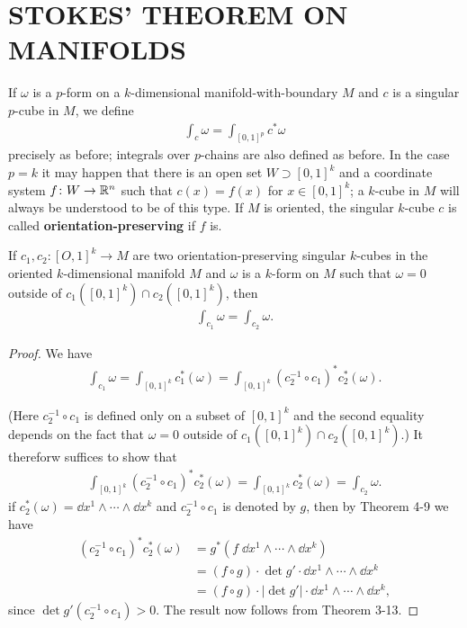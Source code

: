 \clearpage
\section[\textsc{stokes' theorem on manifolds}]{STOKES' THEOREM ON MANIFOLDS}
If $\omega$ is a $p$-form on a $k$-dimensional manifold-with-boundary
$M$ and $c$ is a singular $p$-cube in $M$, we define
\begin{align*}
  \int_c \omega = \int_{[0,1]^p} c^*\omega
\end{align*}
precisely as before; integrals over $p$-chains are also defined as
before. In the case $p = k$ it may happen that there is an
open set $W\supset [0,1]^k$ and a coordinate system $f\colon{}W\to\mathbb{R}^n$ such
that $c(x) = f(x)$ for $x\in [0,1]^k$; a $k$-cube in $M$ will always be
understood to be of this type. If $M$ is oriented, the singular
$k$-cube $c$ is called \textbf{orientation-preserving} if $f$ is.

\begin{theorem}
    If $c_1,c_2: [O,1]^k\to M$ are two orientation-preserving singular $k$-cubes in the 
    oriented $k$-dimensional manifold $M$ and $\omega$ is a $k$-form on $M$ such 
    that $\omega= 0$ outside of $c_1([0,1]^k) \cap c_2([0,1]^k)$, then
    \begin{align*}
      \int_{c_1}\omega = \int_{c_2} \omega.
    \end{align*}
\end{theorem}

\begin{proof}
    We have 
    \begin{align*}
        \int_{c_1}\omega 
        = \int_{[0,1]^k} c_1^*(\omega) 
        = \int_{[0,1]^k} (c_2^{-1}\circ c_1)^*c_2^*(\omega).
    \end{align*}

    (Here $c_2^{-1}\circ c_1$ is defined only on a subset of $[0,1]^k$ and the second equality depends on the 
    fact that $\omega=0$ outside of $c_1([0,1]^k)\cap c_2([0,1]^k)$.) It thereforw suffices to show that 
    \begin{align*}
        \int_{[0,1]^k}(c_2^{-1}\circ c_1)^*c_2^*(\omega)=\int_{[0,1]^k}c_2^*(\omega)=\int_{c_2}\omega.
    \end{align*}
    if $c_2^*(\omega) =\dd x^1\wedge\cdots\wedge\dd x^k$ and $c_2^{-1}\circ c_1$ is denoted 
    by $g$, then by Theorem 4-9 we have 
    \begin{align*}
        (c_2^{-1}\circ c_1)^*c_2^*(\omega)
        & = g^*(f\;\dd x^1\wedge\cdots\wedge \dd x^k) \\
        & = (f\circ g)\cdot\det g'\cdot \dd x^1\wedge\cdots\wedge \dd x^k\\
        & = (f\circ g)\cdot\left|\det g'\right|\cdot \dd x^1\wedge\cdots\wedge \dd x^k,
    \end{align*}
    since $\det g'(c_2^{-1}\circ c_1)>0$. The result now follows from Theorem 3-13.
\end{proof}

